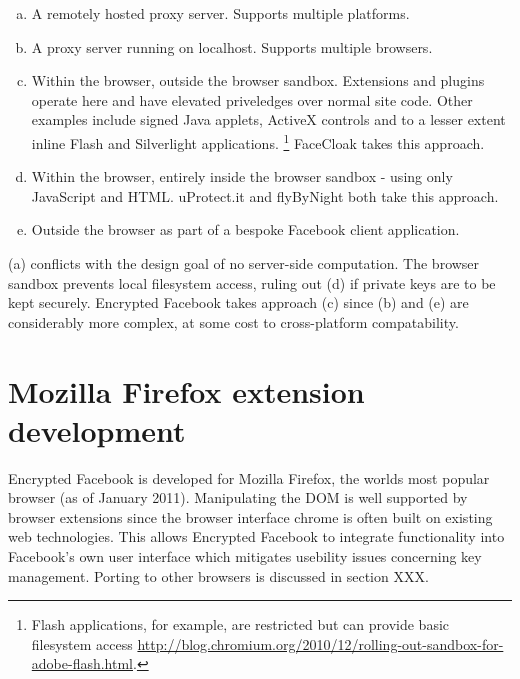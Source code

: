 \begin{enumerate}[(a)]
    
    \item A remotely hosted proxy server. Supports multiple platforms.
    
    \item A proxy server running on localhost. Supports multiple browsers.
    
    \item Within the browser, outside the browser sandbox. Extensions and plugins operate here and have elevated priveledges over normal site code. Other examples include signed Java applets, ActiveX controls and to a lesser extent inline Flash and Silverlight applications. \footnote{Flash applications, for example, are restricted but can provide basic filesystem access \url{http://blog.chromium.org/2010/12/rolling-out-sandbox-for-adobe-flash.html}.} FaceCloak takes this approach.
    
    \item Within the browser, entirely inside the browser sandbox - using only JavaScript and HTML. uProtect.it and flyByNight both take this approach.
    
    \item Outside the browser as part of a bespoke Facebook client application.
    
\end{enumerate}
   
(a) conflicts with the design goal of no server-side computation. The browser sandbox prevents local filesystem access, ruling out (d) if private keys are to be kept securely. Encrypted Facebook takes approach (c) since (b) and (e) are considerably more complex, at some cost to cross-platform compatability.



\section{Mozilla Firefox extension development}

Encrypted Facebook is developed for Mozilla Firefox, the worlds most popular browser (as of January 2011). Manipulating the \ac{DOM} is well supported by browser extensions since the browser interface chrome is often built on existing web technologies. This allows Encrypted Facebook to integrate functionality into Facebook's own user interface which mitigates usebility issues concerning key management. Porting to other browsers is discussed in section XXX.

